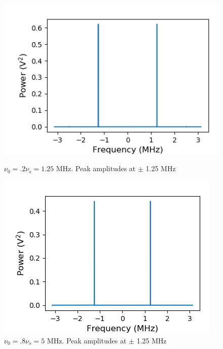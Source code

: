 \documentclass[a4paper]{article}
\begin{document}

\begin{figure}
\centering
\begin{minipage}{.5\textwidth}
	\centering
	\includegraphics[width=.8\linewidth]{5-2_pow2}
	\caption{$\nu_0 = .2 \nu_s = 1.25$ MHz. Peak amplitudes at $\pm$ 1.25 MHz}
	\label{fig:NyPw2}
\end{minipage}%
\begin{minipage}{.5\textwidth}
	\centering
	\includegraphics[width=.8\linewidth]{5-2_pow8}
	\caption{$\nu_0 = .8 \nu_s = 5$ MHz. Peak amplitudes at $\pm$ 1.25 MHz}
	\label{fig:NyPw8}
\end{minipage}
\end{figure}
\end{document}
